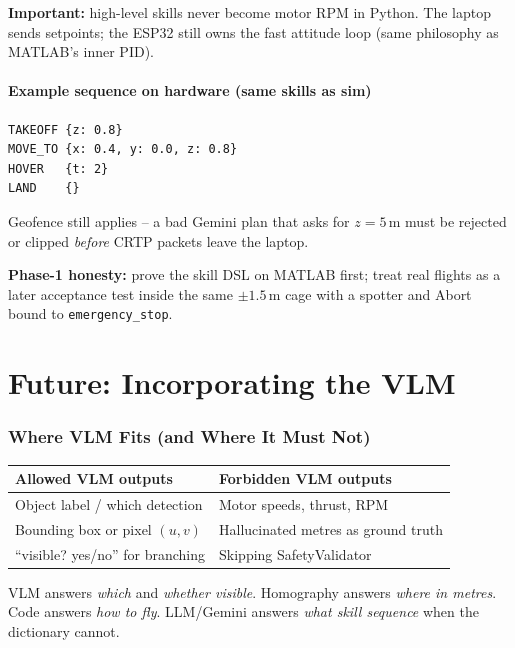 \documentclass[11pt,a4paper]{article}
\begin{document}
\textbf{Important:} high-level skills never become motor RPM in Python. The laptop sends
setpoints; the ESP32 still owns the fast attitude loop (same philosophy as MATLAB's inner PID).

\subsection*{Example sequence on hardware (same skills as sim)}
\begin{verbatim}
TAKEOFF {z: 0.8}
MOVE_TO {x: 0.4, y: 0.0, z: 0.8}
HOVER   {t: 2}
LAND    {}
\end{verbatim}
Geofence still applies -- a bad Gemini plan that asks for $z=5$\,m must be rejected or clipped
\emph{before} CRTP packets leave the laptop.

\begin{quotebox}
\textbf{Phase-1 honesty:} prove the skill DSL on MATLAB first; treat real flights as a later
acceptance test inside the same $\pm 1.5$\,m cage with a spotter and Abort bound to
\texttt{emergency\_stop}.
\end{quotebox}

\part{Future: Incorporating the VLM}

\section{Where VLM Fits (and Where It Must Not)}

\begin{center}
\small
\begin{tabular}{p{5.5cm}p{9.5cm}}
\toprule
\textbf{Allowed VLM outputs} & \textbf{Forbidden VLM outputs} \\
\midrule
Object label / which detection & Motor speeds, thrust, RPM \\
Bounding box or pixel $(u,v)$ & Hallucinated metres as ground truth \\
``visible? yes/no'' for branching & Skipping SafetyValidator \\
\bottomrule
\end{tabular}
\end{center}

\begin{keyidea}[title={\textbf{Design rule}}]
VLM answers \emph{which} and \emph{whether visible}. Homography answers \emph{where in metres}.
Code answers \emph{how to fly}. LLM/Gemini answers \emph{what skill sequence} when the dictionary
cannot.
\end{keyidea}
\end{document}
